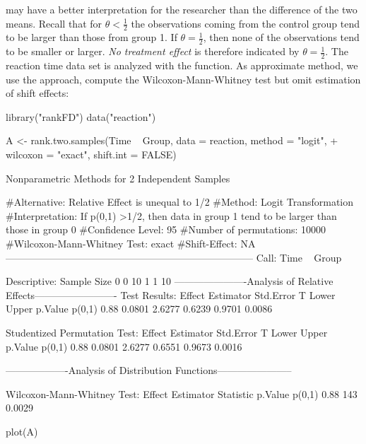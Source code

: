 may have a better interpretation for the researcher than the difference of the 
two means. Recall that for 
$\theta<\frac12$ the observations coming from the control group tend to be 
larger than those from group 1. If $\theta=\frac12$, then none of the 
observations tend to be smaller or larger. \textit{No treatment effect} is 
therefore indicated by $\theta=\frac12$. The reaction time data set is 
analyzed with the  function. As approximate method, we 
use the  approach, compute the  
Wilcoxon-Mann-Whitney test but omit estimation of shift effects:
\begin{example}
library("rankFD")
data("reaction")
\end{example}

%
\begin{example}
A <- rank.two.samples(Time ~ Group, data = reaction, method = "logit",
+                        wilcoxon = "exact", shift.int = FALSE)
\end{example}
\begin{example}
  
               Nonparametric Methods for 2 Independent Samples      
 
 #Alternative: Relative Effect is unequal to 1/2 
 #Method: Logit Transformation 
 #Interpretation: If p(0,1) >1/2, then data in group 1 tend to be 
                  larger than those in group 0 
 #Confidence Level: 95 %
 #Number of permutations: 10000 
 #Wilcoxon-Mann-Whitney Test: exact 
 #Shift-Effect: NA 
---------------------------------------------------------------------------
Call:
Time ~ Group

Descriptive:
  Sample Size
0      0   10
1      1   10
----------------------Analysis of Relative Effects-------------------------
Test Results:
 Effect Estimator Std.Error      T  Lower  Upper p.Value
 p(0,1)      0.88    0.0801 2.6277 0.6239 0.9701  0.0086

Studentized Permutation Test:
 Effect Estimator Std.Error      T  Lower  Upper p.Value
 p(0,1)      0.88    0.0801 2.6277 0.6551 0.9673  0.0016

-------------------Analysis of Distribution Functions----------------------- 
 
Wilcoxon-Mann-Whitney Test:
 Effect Estimator Statistic p.Value
 p(0,1)      0.88       143  0.0029
\end{example}
\begin{example}
plot(A)
\end{example}

